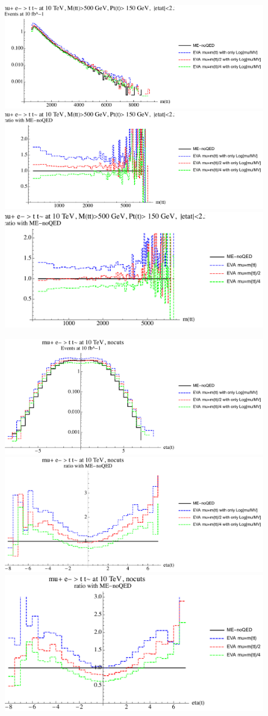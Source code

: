 \documentclass[a4paper,11pt]{article}
\begin{document}
\begin{figure}[ht]
\includegraphics[width=0.46\linewidth]{Notebooks/PlotDistr/ZZ_tt/10TeVcuts/plotmtt.pdf}
\includegraphics[width=0.46\linewidth]{Notebooks/PlotDistr/ZZ_tt/10TeVcuts/plotmttratio1.pdf}
\includegraphics[width=0.46\linewidth]{Notebooks/PlotDistr/ZZ_tt/10TeVcuts/plotmttratio2.pdf}
\end{figure}

\begin{figure}[ht]
\includegraphics[width=0.46\linewidth]{Notebooks/PlotDistr/ZZ_tt/10TeVnocuts/plotetat.pdf}
\includegraphics[width=0.46\linewidth]{Notebooks/PlotDistr/ZZ_tt/10TeVnocuts/plotetatratio1.pdf}
\includegraphics[width=0.46\linewidth]{Notebooks/PlotDistr/ZZ_tt/10TeVnocuts/plotetatratio2.pdf}
\end{figure}
\end{document}
